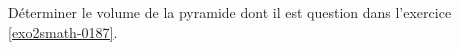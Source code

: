 
\begin{exercice}\label{exo2smath-0189}

    Déterminer le volume de la pyramide dont il est question dans l'exercice \ref{exo2smath-0187}.

\end{exercice}
